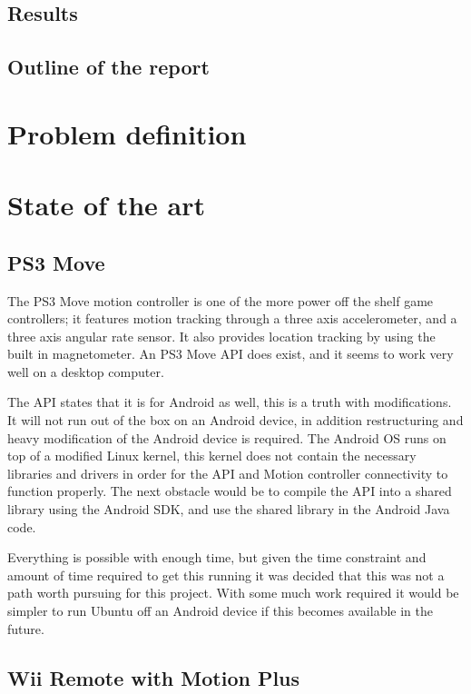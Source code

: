 \documentclass[11pt,twoside,a4paper]{report}
\begin{document}
\section{Results}


\section{Outline of the report}

\chapter{Problem definition}

\chapter{State of the art}

\section{PS3 Move}
The PS3 Move motion controller is one of the more power off the shelf game controllers; it features motion tracking through a three axis accelerometer, and a three axis angular rate sensor. It also provides location tracking by using the built in magnetometer. %
An PS3 Move API does exist, and it seems to work very well on a desktop computer.

The API states that it is for Android as well, this is a truth with modifications. It will not run out of the box on an Android device, in addition restructuring and heavy modification of the Android device is required.  The Android OS runs on top of a modified Linux kernel, this kernel does not contain the necessary libraries and drivers in order for the API and Motion controller connectivity to function properly. %
The next obstacle would be to compile the API into a shared library using the Android SDK, and use the shared library in the Android Java code. 

Everything is possible with enough time, but given the time constraint and amount of time required to get this running it was decided that this was not a path worth pursuing for this project. With some much work required it would be simpler to run Ubuntu off an Android device if this becomes available in the future. %

\section{Wii Remote with Motion Plus}
\end{document}
